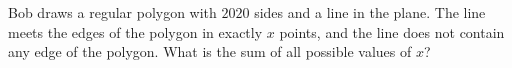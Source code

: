 Bob draws a regular polygon with $2020$ sides and a line in the plane. The line meets the edges of the polygon in exactly $x$ points, and the line does not contain any edge of the polygon. What is the sum of all possible values of $x$?
